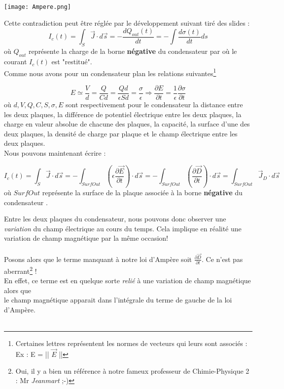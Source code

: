 \documentclass[a4paper,12pt]{article}
\begin{document}
\begin{center}
\texttt{[image: Ampere.png]}
\end{center}

Cette contradiction peut être réglée par le développement suivant tiré des slides :
\[I_{c}(t) = \int_{S} \vec{J} \cdot d\vec{s} = -\frac{dQ_{out}(t)}{dt} = - \int \frac{d \sigma(t)}{dt} ds\] 
où $Q_{out}$ représente la charge de la borne \textbf{négative} du condensateur par où le courant $I_{c}(t)$ est "restitué". \\ 

Comme nous avons pour un condensateur plan les relations suivantes\footnote{Certaines lettres représentent les normes de vecteurs qui leurs sont associés : Ex : E = || $\vec{E}$ ||} 

\[ E \simeq \frac{V}{d} = \frac{Q}{Cd} = \frac{Qd}{\epsilon S d} = \frac{\sigma}{\epsilon} \Rightarrow \frac{\partial E}{\partial t} = \frac{1}{\epsilon} \frac{\partial \sigma}{\partial t} \]
où $d,V,Q,C,S,\sigma,E$ sont respectivement pour le condensateur la distance entre les deux plaques, la différence de potentiel électrique entre les deux plaques, la charge en valeur absolue de chacune des plaques, 
la capacité, la surface d'une des deux plaques, la densité de charge par plaque et le champ électrique entre les deux plaques. \\ 
Nous pouvons maintenant écrire :

\[ I_{c}(t) = \int_{S} \vec{J} \cdot d\vec{s} = -\int_{SurfOut}( \epsilon \frac{\partial \vec{E}}{\partial t} )\cdot d\vec{s} = - \int_{SurfOut} (\frac{\partial \vec{D}}{\partial t}) \cdot d\vec{s}  =  \int_{SurfOut} \vec{J}_{D} \cdot d\vec{s}\]
où $SurfOut$ représente la surface de la plaque associée à la borne \textbf{négative} du condensateur .

\newpage 

Entre les deux plaques du condensateur, nous pouvons donc observer une \textit{variation} du champ électrique au cours du temps. Cela implique en réalité une variation de champ magnétique par la même occasion! \\ \\
Posons alors que le terme manquant à notre loi d'Ampère soit $\frac{\partial \vec{D}}{\partial t}$. Ce n'est pas aberrant\footnote{Oui, il y a bien un référence à notre fameux professeur de Chimie-Physique 2 : Mr \textit{Jeanmart} ;-)} ! \\
En effet, ce terme est en quelque sorte \textit{relié} à une variation de champ magnétique alors que \\le champ magnétique apparait dans l'intégrale du terme de gauche de la loi d'Ampère. \\ \\
\end{document}
